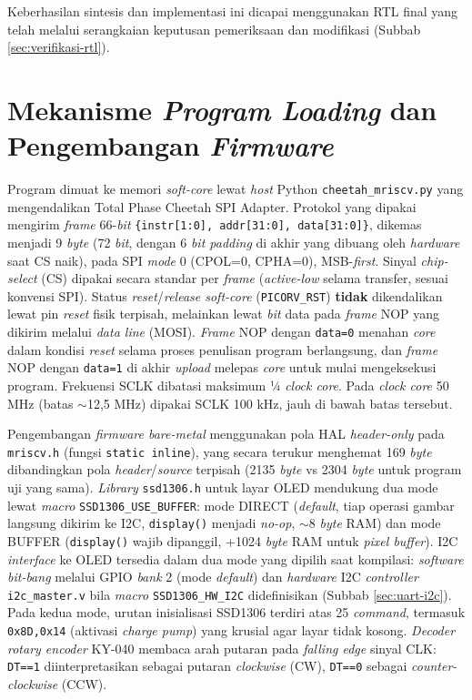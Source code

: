 Keberhasilan sintesis dan implementasi ini dicapai menggunakan RTL final yang telah melalui serangkaian keputusan pemeriksaan dan modifikasi (Subbab \ref{sec:verifikasi-rtl}).

\section{Mekanisme \textit{Program Loading} dan Pengembangan \textit{Firmware}}
\label{sec:firmware-spi}

Program dimuat ke memori \textit{soft-core} lewat \textit{host} Python \texttt{cheetah\_mriscv.py} yang mengendalikan Total Phase Cheetah SPI Adapter. Protokol yang dipakai mengirim \textit{frame} 66-\textit{bit} \texttt{\{instr[1:0], addr[31:0], data[31:0]\}}, dikemas menjadi 9 \textit{byte} (72 \textit{bit}, dengan 6 \textit{bit padding} di akhir yang dibuang oleh \textit{hardware} saat CS naik), pada SPI \textit{mode} 0 (CPOL=0, CPHA=0), MSB-\textit{first}. Sinyal \textit{chip-select} (CS) dipakai secara standar per \textit{frame} (\textit{active-low} selama transfer, sesuai konvensi SPI). Status \textit{reset}/\textit{release soft-core} (\texttt{PICORV\_RST}) \textbf{tidak} dikendalikan lewat pin \textit{reset} fisik terpisah, melainkan lewat \textit{bit} data pada \textit{frame} NOP yang dikirim melalui \textit{data line} (MOSI). \textit{Frame} NOP dengan \texttt{data=0} menahan \textit{core} dalam kondisi \textit{reset} selama proses penulisan program berlangsung, dan \textit{frame} NOP dengan \texttt{data=1} di akhir \textit{upload} melepas \textit{core} untuk mulai mengeksekusi program. Frekuensi SCLK dibatasi maksimum ¼ \textit{clock core}. Pada \textit{clock core} 50 MHz (batas $\sim$12,5 MHz) dipakai SCLK 100 kHz, jauh di bawah batas tersebut.

Pengembangan \textit{firmware bare-metal} menggunakan pola HAL \textit{header-only} pada \texttt{mriscv.h} (fungsi \texttt{static inline}), yang secara terukur menghemat 169 \textit{byte} dibandingkan pola \textit{header}/\textit{source} terpisah (2135 \textit{byte} vs 2304 \textit{byte} untuk program uji yang sama). \textit{Library} \texttt{ssd1306.h} untuk layar OLED mendukung dua mode lewat \textit{macro} \texttt{SSD1306\_USE\_BUFFER}: mode DIRECT (\textit{default}, tiap operasi gambar langsung dikirim ke I2C, \texttt{display()} menjadi \textit{no-op}, $\sim$8 \textit{byte} RAM) dan mode BUFFER (\texttt{display()} wajib dipanggil, +1024 \textit{byte} RAM untuk \textit{pixel buffer}). I2C \textit{interface} ke OLED tersedia dalam dua mode yang dipilih saat kompilasi: \textit{software bit-bang} melalui GPIO \textit{bank} 2 (mode \textit{default}) dan \textit{hardware} I2C \textit{controller} \texttt{i2c\_master.v} bila \textit{macro} \texttt{SSD1306\_HW\_I2C} didefinisikan (Subbab \ref{sec:uart-i2c}). Pada kedua mode, urutan inisialisasi SSD1306 terdiri atas 25 \textit{command}, termasuk \texttt{0x8D,0x14} (aktivasi \textit{charge pump}) yang krusial agar layar tidak kosong. \textit{Decoder} \textit{rotary encoder} KY-040 membaca arah putaran pada \textit{falling edge} sinyal CLK: \texttt{DT==1} diinterpretasikan sebagai putaran \textit{clockwise} (CW), \texttt{DT==0} sebagai \textit{counter-clockwise} (CCW).

